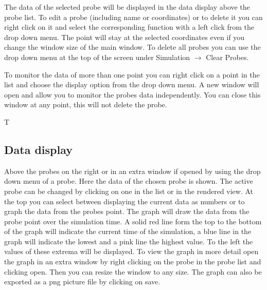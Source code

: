 \documentclass[paper=a4]{proc}
\begin{document}
		The data of the selected probe will be displayed in the data display above the probe list. To edit a probe (including name or coordinates) or to delete it you can right click on it and select the corresponding function with a left click from the drop down menu. The point will stay at the selected coordinates even if you change the window size of the main window. To delete all probes you can use the drop down menu at the top of the screen under Simulation $\rightarrow$ Clear Probes.
		
		To monitor the data of more than one point you can right click on a point in the list and choose the display option from the drop down menu. A new window will open and allow you to monitor the probes data independently. You can close this window at any point, this will not delete the probe.
		
		T		\subsection{Data display}
		Above the probes on the right or in an extra window if opened by using the drop down menu of a probe. Here the data of the chosen probe is shown. The active probe can be changed by clicking on one in the list or in the rendered view. At the top you can select between displaying the current data as numbers or to graph the data from the probes point. The graph will draw the data from the probe point over the simulation time. A solid red line form the top to the bottom of the graph will indicate the current time of the simulation, a blue line in the graph will indicate the lowest and a pink line the highest value. To the left the values of these extrema will be displayed. To view the graph in more detail open the graph in an extra window by right clicking on the probe in the probe list and clicking open. Then you can resize the window to any size. The graph can also be exported as a png picture file by clicking on save.
\end{document}
